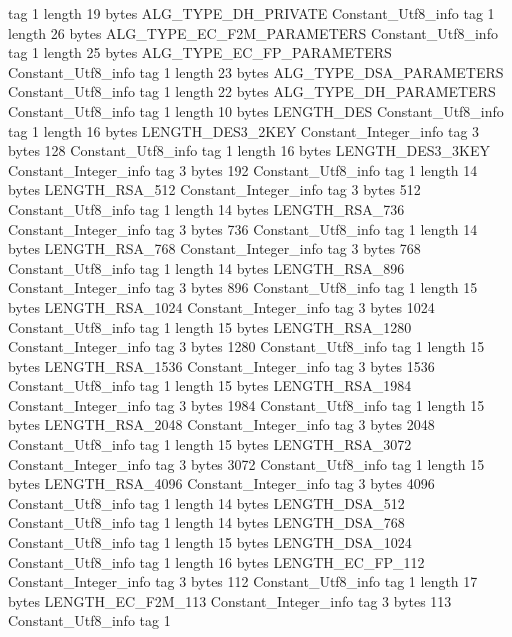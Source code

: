 {{{			tag	1
			length	19
			bytes	ALG_TYPE_DH_PRIVATE
		}
		Constant_Utf8_info {
			tag	1
			length	26
			bytes	ALG_TYPE_EC_F2M_PARAMETERS
		}
		Constant_Utf8_info {
			tag	1
			length	25
			bytes	ALG_TYPE_EC_FP_PARAMETERS
		}
		Constant_Utf8_info {
			tag	1
			length	23
			bytes	ALG_TYPE_DSA_PARAMETERS
		}
		Constant_Utf8_info {
			tag	1
			length	22
			bytes	ALG_TYPE_DH_PARAMETERS
		}
		Constant_Utf8_info {
			tag	1
			length	10
			bytes	LENGTH_DES
		}
		Constant_Utf8_info {
			tag	1
			length	16
			bytes	LENGTH_DES3_2KEY
		}
		Constant_Integer_info {
			tag	3
			bytes	128
		}
		Constant_Utf8_info {
			tag	1
			length	16
			bytes	LENGTH_DES3_3KEY
		}
		Constant_Integer_info {
			tag	3
			bytes	192
		}
		Constant_Utf8_info {
			tag	1
			length	14
			bytes	LENGTH_RSA_512
		}
		Constant_Integer_info {
			tag	3
			bytes	512
		}
		Constant_Utf8_info {
			tag	1
			length	14
			bytes	LENGTH_RSA_736
		}
		Constant_Integer_info {
			tag	3
			bytes	736
		}
		Constant_Utf8_info {
			tag	1
			length	14
			bytes	LENGTH_RSA_768
		}
		Constant_Integer_info {
			tag	3
			bytes	768
		}
		Constant_Utf8_info {
			tag	1
			length	14
			bytes	LENGTH_RSA_896
		}
		Constant_Integer_info {
			tag	3
			bytes	896
		}
		Constant_Utf8_info {
			tag	1
			length	15
			bytes	LENGTH_RSA_1024
		}
		Constant_Integer_info {
			tag	3
			bytes	1024
		}
		Constant_Utf8_info {
			tag	1
			length	15
			bytes	LENGTH_RSA_1280
		}
		Constant_Integer_info {
			tag	3
			bytes	1280
		}
		Constant_Utf8_info {
			tag	1
			length	15
			bytes	LENGTH_RSA_1536
		}
		Constant_Integer_info {
			tag	3
			bytes	1536
		}
		Constant_Utf8_info {
			tag	1
			length	15
			bytes	LENGTH_RSA_1984
		}
		Constant_Integer_info {
			tag	3
			bytes	1984
		}
		Constant_Utf8_info {
			tag	1
			length	15
			bytes	LENGTH_RSA_2048
		}
		Constant_Integer_info {
			tag	3
			bytes	2048
		}
		Constant_Utf8_info {
			tag	1
			length	15
			bytes	LENGTH_RSA_3072
		}
		Constant_Integer_info {
			tag	3
			bytes	3072
		}
		Constant_Utf8_info {
			tag	1
			length	15
			bytes	LENGTH_RSA_4096
		}
		Constant_Integer_info {
			tag	3
			bytes	4096
		}
		Constant_Utf8_info {
			tag	1
			length	14
			bytes	LENGTH_DSA_512
		}
		Constant_Utf8_info {
			tag	1
			length	14
			bytes	LENGTH_DSA_768
		}
		Constant_Utf8_info {
			tag	1
			length	15
			bytes	LENGTH_DSA_1024
		}
		Constant_Utf8_info {
			tag	1
			length	16
			bytes	LENGTH_EC_FP_112
		}
		Constant_Integer_info {
			tag	3
			bytes	112
		}
		Constant_Utf8_info {
			tag	1
			length	17
			bytes	LENGTH_EC_F2M_113
		}
		Constant_Integer_info {
			tag	3
			bytes	113
		}
		Constant_Utf8_info {
			tag	1
}}}
